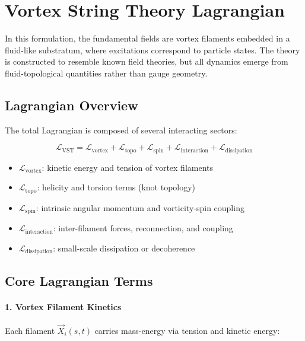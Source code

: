 \documentclass[11pt]{article}
\begin{document}
    \section{Vortex String Theory Lagrangian}

    In this formulation, the fundamental fields are vortex filaments embedded in a fluid-like substratum, where excitations correspond to particle states. The theory is constructed to resemble known field theories, but all dynamics emerge from fluid-topological quantities rather than gauge geometry.

    \subsection{Lagrangian Overview}

    The total Lagrangian is composed of several interacting sectors:

    \[
        \mathcal{L}_{\text{VST}} = \mathcal{L}_{\text{vortex}} + \mathcal{L}_{\text{topo}} + \mathcal{L}_{\text{spin}} + \mathcal{L}_{\text{interaction}} + \mathcal{L}_{\text{dissipation}}
    \]

    \begin{itemize}
        \item \( \mathcal{L}_{\text{vortex}} \): kinetic energy and tension of vortex filaments
        \item \( \mathcal{L}_{\text{topo}} \): helicity and torsion terms (knot topology)
        \item \( \mathcal{L}_{\text{spin}} \): intrinsic angular momentum and vorticity-spin coupling
        \item \( \mathcal{L}_{\text{interaction}} \): inter-filament forces, reconnection, and coupling
        \item \( \mathcal{L}_{\text{dissipation}} \): small-scale dissipation or decoherence
    \end{itemize}

    \subsection{Core Lagrangian Terms}

    \paragraph{1. Vortex Filament Kinetics}

    Each filament \( \vec{X}_i(s, t) \) carries mass-energy via tension and kinetic energy:
\end{document}
